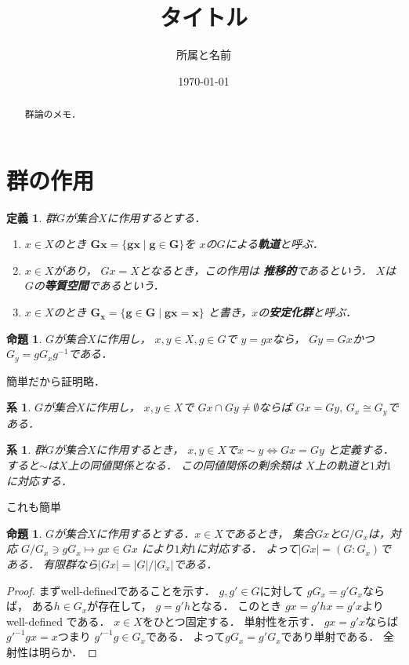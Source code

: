 \documentclass[dvipdfmx,a4paper,12pt]{jsarticle}
\title{タイトル}
\author{所属と名前}
\date{\today}
\newtheorem{definition}[theorem]{定義}
\newtheorem{proposition}[theorem]{命題}
\newtheorem{corollary}[theorem]{系}
\begin{document}
\begin{abstract}
群論のメモ．
\end{abstract}

\section{群の作用}
\begin{definition}
    群$G$が集合$X$に作用するとする．
    \begin{enumerate}
        \item $x\in X$のとき
        $\bm{Gx=\{gx\mid g\in G\}}$を
        $x$の$G$による\textbf{軌道}と呼ぶ．
        \item $x\in X$があり，
        $Gx=X$となるとき，この作用は
        \textbf{推移的}であるという．
        $X$は$G$の\textbf{等質空間}であるという．
        \item $x\in X$のとき
        $\bm{G_x=\{ g\in G \mid 
        gx=x\}}$
        と書き，$x$の\textbf{安定化群}と呼ぶ．
    \end{enumerate}
\end{definition}
\begin{proposition}
    $G$が集合$X$に作用し，
    $x,y\in X,g\in G$で
    $y=gx$なら，
    $Gy=Gx$かつ$G_y=gG_xg^{-1}$である．
\end{proposition}
    簡単だから証明略．
\begin{corollary}
    $G$が集合$X$に作用し，
    $x,y\in X$で
    $Gx\cap Gy\neq \emptyset$ならば
    $Gx=Gy,\, G_x\cong G_y$である．
\end{corollary}
\begin{corollary}
    群$G$が集合$X$に作用するとき，
    $x,y\in X$で$x\sim y \Leftrightarrow Gx=Gy$
    と定義する．
    すると$\sim$は$X$上の同値関係となる．
    この同値関係の剰余類は
    $X$上の軌道と$1$対$1$に対応する．
\end{corollary}
これも簡単
\begin{proposition}\label{1.5}
    $G$が集合$X$に作用するとする．$x\in X$であるとき，
    集合$Gx$と$G/G_x$は，対応
    $G/G_x\ni gG_x\mapsto gx\in Gx$
    により$1$対$1$に対応する．
    よって$|Gx|=(G\colon G_x)$である．
    有限群なら$|Gx|=|G|/|G_x|$である．
\end{proposition}
\begin{proof}
    まずwell-definedであることを示す．
    $g,g'\in G$に対して
    $gG_x=g'G_x$ならば，
    ある$h\in G_x$が存在して，
    $g=g'h$となる．
    このとき
    $gx=g'hx=g'x$よりwell-defined
    である．
    $x\in X$をひとつ固定する．
    単射性を示す．
    $gx=g'x$ならば
    $g'^{-1}gx=x$つまり
    $g'^{-1}g\in G_x$である．
    よって$gG_x=g'G_x$であり単射である．
    全射性は明らか．
\end{proof}
\end{document}
